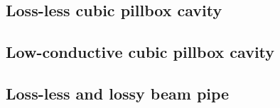 \subsection{Loss-less cubic pillbox cavity}




\subsection{Low-conductive cubic pillbox cavity}

\subsection{Loss-less and lossy beam pipe}

